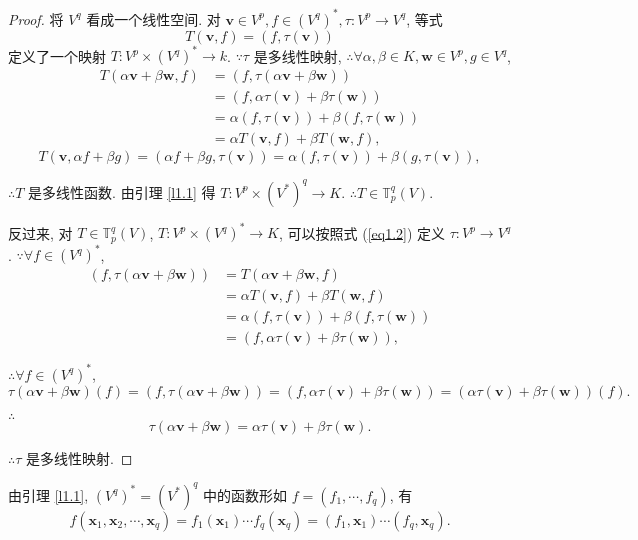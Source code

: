 \documentclass[color=black,device=normal,lang=cn,mode=geye]{elegantnote}
\begin{document}
\begin{proof}
    将 $V^q$ 看成一个线性空间. 对 $\boldsymbol{v}\in V^p,f\in(V^q)^*,\tau:V^p\to V^q$, 等式
    \begin{equation}\label{eq1.2}
        T(\boldsymbol{v},f)=(f,\tau(\boldsymbol{v}))
    \end{equation}
    定义了一个映射 $T:V^p\times(V^q)^*\to k$. $\because\tau$ 是多线性映射, $\therefore\forall\alpha,\beta\in K,\boldsymbol{w}\in V^p,g\in V^q$,
    \begin{align*}
        T(\alpha\boldsymbol{v}+\beta\boldsymbol{w},f) & =(f,\tau(\alpha\boldsymbol{v}+\beta\boldsymbol{w})) \\
        & =(f,\alpha\tau(\boldsymbol{v})+\beta\tau(\boldsymbol{w})) \\
        & =\alpha(f,\tau(\boldsymbol{v}))+\beta(f,\tau(\boldsymbol{w})) \\
        & =\alpha T(\boldsymbol{v},f)+\beta T(\boldsymbol{w},f),
    \end{align*}
    \[T(\boldsymbol{v},\alpha f+\beta g)=(\alpha f+\beta g,\tau(\boldsymbol{v}))=\alpha(f,\tau(\boldsymbol{v}))+\beta(g,\tau(\boldsymbol{v})),\]

    $\therefore T$ 是多线性函数. 由引理 \ref{l1.1} 得 $T:V^p\times(V^*)^q\to K$. $\therefore T\in\mathbb{T}_p^q(V)$.

    反过来, 对 $T\in\mathbb{T}_p^q(V)$, $T:V^p\times(V^q)^*\to K$, 可以按照式 (\ref{eq1.2}) 定义 $\tau:V^p\to V^q$. $\because\forall f\in(V^q)^*$,
    \begin{align*}
        (f,\tau(\alpha\boldsymbol{v}+\beta\boldsymbol{w})) & =T(\alpha\boldsymbol{v}+\beta\boldsymbol{w},f) \\
        & =\alpha T(\boldsymbol{v},f)+\beta T(\boldsymbol{w},f) \\
        & =\alpha(f,\tau(\boldsymbol{v}))+\beta(f,\tau(\boldsymbol{w})) \\
        & =(f,\alpha\tau(\boldsymbol{v})+\beta\tau(\boldsymbol{w})),
    \end{align*}

    $\therefore\forall f\in(V^q)^*$,
    \[\tau(\alpha\boldsymbol{v}+\beta\boldsymbol{w})(f)=(f,\tau(\alpha\boldsymbol{v}+\beta\boldsymbol{w}))=(f,\alpha\tau(\boldsymbol{v})+\beta\tau(\boldsymbol{w}))=(\alpha\tau(\boldsymbol{v})+\beta\tau(\boldsymbol{w}))(f).\]

    $\therefore$
    \[\tau(\alpha\boldsymbol{v}+\beta\boldsymbol{w})=\alpha\tau(\boldsymbol{v})+\beta\tau(\boldsymbol{w}).\]

    $\therefore\tau$ 是多线性映射.
\end{proof}
由引理 \ref{l1.1}, $(V^q)^*=(V^*)^q$ 中的函数形如 $f=(f_1,\cdots,f_q)$, 有
\[f(\boldsymbol{x}_1,\boldsymbol{x}_2,\cdots,\boldsymbol{x}_q)=f_1(\boldsymbol{x}_1)\cdots f_q(\boldsymbol{x}_q)=(f_1,\boldsymbol{x}_1)\cdots(f_q,\boldsymbol{x}_q).\]
\end{document}
